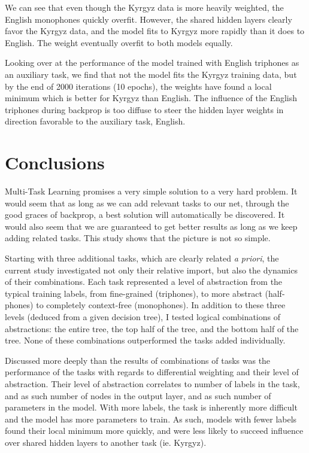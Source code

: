 \documentclass[a4paper]{article}
\begin{document}
We can see that even though the Kyrgyz data is more heavily weighted, the English monophones quickly overfit. However, the shared hidden layers clearly favor the Kyrgyz data, and the model fits to Kyrgyz more rapidly than it does to English. The weight eventually overfit to both models equally.

Looking over at the performance of the model trained with English triphones as an auxiliary task, we find that not the model fits the Kyrgyz training data, but by the end of 2000 iterations (10 epochs), the weights have found a local minimum which is better for Kyrgyz than English. The influence of the English triphones during backprop is too diffuse to steer the hidden layer weights in direction favorable to the auxiliary task, English.


\section{Conclusions}

Multi-Task Learning promises a very simple solution to a very hard problem. It would seem that as long as we can add relevant tasks to our net, through the good graces of backprop, a best solution will automatically be discovered. It would also seem that we are guaranteed to get better results as long as we keep adding related tasks. This study shows that the picture is not so simple.

Starting with three additional tasks, which are clearly related \textit{a priori}, the current study investigated not only their relative import, but also the dynamics of their combinations. Each task represented a level of abstraction from the typical training labels, from fine-grained (triphones), to more abstract (half-phones) to completely context-free (monophones). In addition to these three levels (deduced from a given decision tree), I tested logical combinations of abstractions: the entire tree, the top half of the tree, and the bottom half of the tree. None of these combinations outperformed the tasks added individually.

Discussed more deeply than the results of combinations of tasks was the performance of the tasks with regards to differential weighting and their level of abstraction. Their level of abstraction correlates to number of labels in the task, and as such number of nodes in the output layer, and as such number of parameters in the model. With more labels, the task is inherently more difficult and the model has more parameters to train. As such, models with fewer labels found their local minimum more quickly, and were less likely to succeed influence over shared hidden layers to another task (ie. Kyrgyz).
\end{document}
